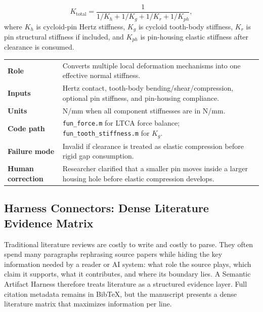 \documentclass{article}
\begin{document}
\begin{tcolorbox}[colback=blue!5!white,colframe=blue!75!black,title=Formula Passport: Effective Normal Stiffness,arc=4mm,boxrule=1pt]
\begin{equation}
    K_{\mathrm{total}} =
    \frac{1}{1/K_h + 1/K_g + 1/K_r + 1/K_{ph}},
    \label{eq:series_stiffness}
\end{equation}
where $K_h$ is cycloid-pin Hertz stiffness, $K_g$ is cycloid tooth-body stiffness, $K_r$ is pin structural stiffness if included, and $K_{ph}$ is pin-housing elastic stiffness after clearance is consumed.

\vspace{2mm}
\small
\begin{tabular}{>{\bfseries}p{3.0cm}p{10.5cm}}
\toprule
Role & Converts multiple local deformation mechanisms into one effective normal stiffness. \\
Inputs & Hertz contact, tooth-body bending/shear/compression, optional pin stiffness, and pin-housing compliance. \\
Units & N/mm when all component stiffnesses are in N/mm. \\
Code path & \texttt{fun\_force.m} for LTCA force balance; \texttt{fun\_tooth\_stiffness.m} for $K_g$. \\
Failure mode & Invalid if clearance is treated as elastic compression before rigid gap consumption. \\
Human correction & Researcher clarified that a smaller pin moves inside a larger housing hole before elastic compression develops. \\
\bottomrule
\end{tabular}
\end{tcolorbox}

\subsection{Harness Connectors: Dense Literature Evidence Matrix}

Traditional literature reviews are costly to write and costly to parse. They often spend many paragraphs rephrasing source papers while hiding the key information needed by a reader or AI system: what role the source plays, which claim it supports, what it contributes, and where its boundary lies. A Semantic Artifact Harness therefore treats literature as a structured evidence layer. Full citation metadata remains in BibTeX, but the manuscript presents a dense literature matrix that maximizes information per line.
\end{document}
